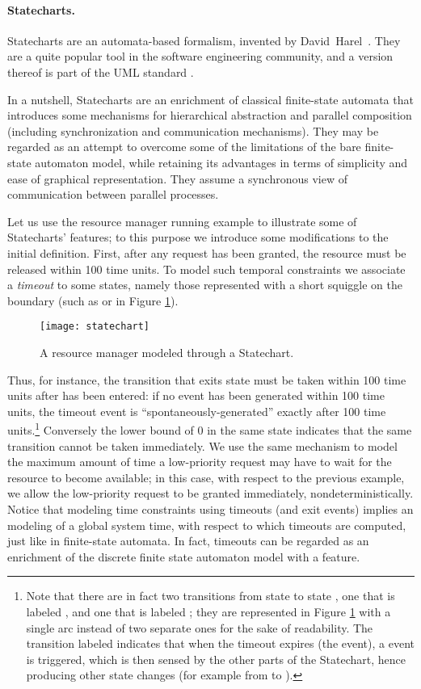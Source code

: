 \paragraph{Statecharts.}
Statecharts are an automata-based formalism, invented by \linebreak
David~Harel~\cite{Har87}. They are a quite popular tool in the
software engineering community, and a version thereof is part of the
UML standard \cite{UML05,UML04}.

In a nutshell, Statecharts are an enrichment of classical finite-state 
automata that introduces some mechanisms for hierarchical abstraction 
and parallel composition (including synchronization and communication 
mechanisms). They may be regarded as an attempt to overcome some 
of the limitations of the bare finite-state automaton model, 
while retaining its advantages in terms of simplicity and ease 
of graphical representation. They assume a synchronous view of 
communication between parallel processes.

Let us use the resource manager running example to illustrate 
some of Statecharts' features; to this purpose we introduce some 
modifications to the initial definition. First, after any request has 
been granted, the resource must be released within 100 time units. 
To model such  temporal constraints we associate a \emph{timeout} 
to some states, namely those represented with a short squiggle 
on the boundary (such as  or  in Figure \ref{fig:statechart}).

\begin{figure}[htb!]
	 \centering
	 \texttt{[image: statechart]}
	 \caption{A resource manager modeled through a Statechart.}
	 \label{fig:statechart}
\end{figure}

Thus, for instance, the transition that exits state  must be
taken within 100 time units after  has been entered: if no
 event has been generated within 100 time units, the timeout
event  is ``spontaneously-generated'' exactly after 100 time
units.\footnote{Note that there are in fact two transitions from state
   to state , one that is labeled , and one
  that is labeled ; they are represented in Figure
  \ref{fig:statechart} with a single arc instead of two separate ones
  for the sake of readability. The transition labeled 
  indicates that when the timeout expires (the  event), a 
  event is triggered, which is then sensed by the other parts of the
  Statechart, hence producing other state changes (for example from
   to ).}  Conversely the lower bound of 0 in the same
state indicates that the same transition cannot be taken
immediately. We use the same mechanism to model the maximum amount of
time a low-priority request may have to wait for the resource to
become available; in this case, with respect to the previous example,
we allow the low-priority request to be granted immediately,
nondeterministically. Notice that modeling time constraints using
timeouts (and exit events) implies an  modeling of a
global system time, with respect to which timeouts are computed, just
like in finite-state automata.  In fact, timeouts can be regarded as
an enrichment of the discrete finite state automaton model with a
 feature.

